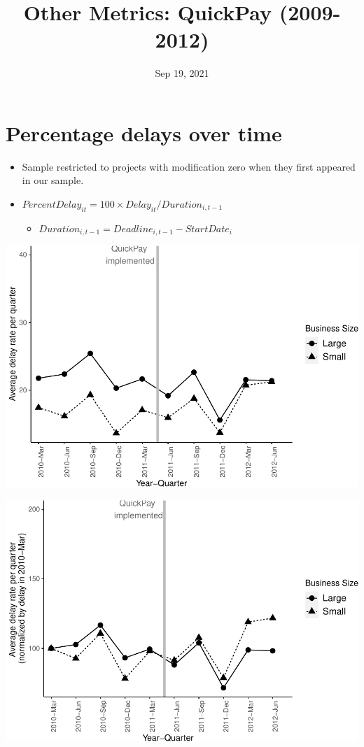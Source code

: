 \documentclass[
]{article}
\title{Other Metrics: QuickPay (2009-2012)}
\author{}
\date{\vspace{-2.5em}Sep 19, 2021}
\providecommand{\tightlist}{%
  \setlength{\itemsep}{0pt}\setlength{\parskip}{0pt}}
\begin{document}
\maketitle

\hypertarget{percentage-delays-over-time}{%
\section{Percentage delays over
time}\label{percentage-delays-over-time}}

\begin{itemize}
\tightlist
\item
  Sample restricted to projects with modification zero when they first
  appeared in our sample.
\item
  \(PercentDelay_{it}=100 \times Delay_{it}/Duration_{i,t-1}\)

  \begin{itemize}
  \tightlist
  \item
    \(Duration_{i,t-1} = Deadline_{i,t-1} - StartDate_i\)
  \end{itemize}
\end{itemize}

\includegraphics{qp_first_pc_delay_files/figure-latex/plot_relative_delay-1.pdf}

\includegraphics{qp_first_pc_delay_files/figure-latex/normalized_plot-1.pdf}
\end{document}
